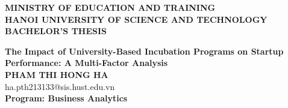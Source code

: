 \documentclass[Main.tex]{subfiles}
\begin{document}
\begin{titlepage}
\thispagestyle{empty}
\begin{center}

{\textbf{\large{MINISTRY OF EDUCATION AND TRAINING}}}\\
{\textbf{\large{HANOI UNIVERSITY OF SCIENCE AND TECHNOLOGY}}}\\[4cm]

{\textbf{\huge{BACHELOR'S THESIS}}}\\[1cm]
{\textbf{\Large{The Impact of University-Based Incubation Programs on Startup Performance: A Multi-Factor Analysis}}\\[1cm]

{\textbf{\large{PHAM THI HONG HA}}}\\
{\large{ha.pth213133@sis.hust.edu.vn}}\\[0.5cm]

{\textbf{\large{Program: Business Analytics}}}\\

\vspace{2cm}
\begin{table}[H]
\centering
{}
\end{table}}
\end{center}



\end{titlepage}
\end{document}
